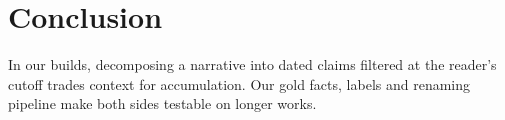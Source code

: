 \section{Conclusion}
\label{sec:conclusion}

In our builds, decomposing a narrative into dated claims filtered at the reader's cutoff
trades context for accumulation. Our gold facts, labels and renaming pipeline make both sides
testable on longer works.
